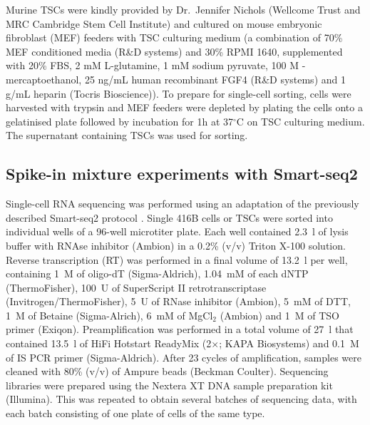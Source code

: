 \documentclass{article}
\begin{document}
Murine TSCs were kindly provided by Dr.\ Jennifer Nichols (Wellcome Trust and MRC Cambridge Stem Cell Institute) and cultured on mouse embryonic fibroblast (MEF) feeders with TSC culturing medium (a combination of 70\% MEF conditioned media (R\&D systems) and 30\% RPMI 1640, supplemented with 20\% FBS, 2 mM L-glutamine, 1 mM sodium pyruvate, 100 \textmu{}M \textbeta{}-mercaptoethanol, 25 ng/mL human recombinant FGF4 (R\&D systems) and 1 \textmu{}g/mL heparin (Tocris Bioscience)). 
To prepare for single-cell sorting, cells were harvested with trypsin and MEF feeders were depleted by plating the cells onto a gelatinised plate followed by incubation for 1h at 37$^{\circ}$C on TSC culturing medium. 
The supernatant containing TSCs was used for sorting.

\subsection{Spike-in mixture experiments with Smart-seq2}

Single-cell RNA sequencing was performed using an adaptation of the previously described Smart-seq2 protocol \cite{picelli2014full}.
Single 416B cells or TSCs were sorted into individual wells of a 96-well microtiter plate.
Each well contained 2.3~\textmu{}l of lysis buffer with RNAse inhibitor (Ambion) in a 0.2\% (v/v) Triton X-100 solution. 
Reverse transcription (RT) was performed in a final volume of 13.2~\textmu{}l per well, containing 1~\textmu{}M of oligo-dT (Sigma-Aldrich), 1.04~mM of each dNTP (ThermoFisher), 100~U of SuperScript II retrotranscriptase (Invitrogen/ThermoFisher), 5~U of RNase inhibitor (Ambion), 5~mM of DTT, 1~M of Betaine (Sigma-Alrich), 6~mM of MgCl$_2$ (Ambion) and 1~\textmu{}M of TSO primer (Exiqon).
Preamplification was performed in a total volume of 27~\textmu{}l that contained 13.5~\textmu{}l of HiFi Hotstart ReadyMix (2$\times$; KAPA Biosystems) and 0.1~\textmu{}M of IS PCR primer (Sigma-Aldrich). 
After 23 cycles of amplification, samples were cleaned with 80\% (v/v) of Ampure beads (Beckman Coulter). 
Sequencing libraries were prepared using the Nextera XT DNA sample preparation kit (Illumina).
This was repeated to obtain several batches of sequencing data, with each batch consisting of one plate of cells of the same type.
\end{document}
